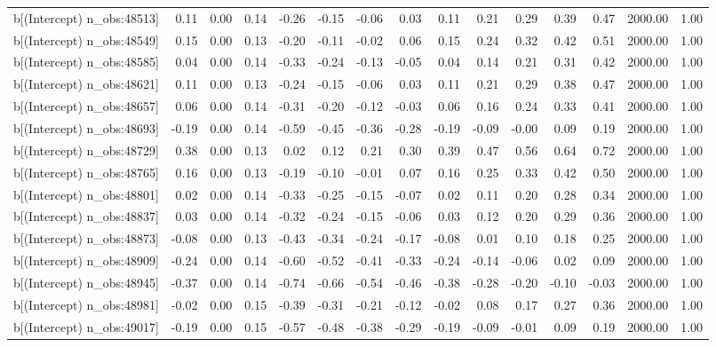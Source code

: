 \begin{table}[ht]
\begin{tabular}{rrrrrrrrrrrrrrr}
  b[(Intercept) n\_obs:48513] & 0.11 & 0.00 & 0.14 & -0.26 & -0.15 & -0.06 & 0.03 & 0.11 & 0.21 & 0.29 & 0.39 & 0.47 & 2000.00 & 1.00 \\ 
  b[(Intercept) n\_obs:48549] & 0.15 & 0.00 & 0.13 & -0.20 & -0.11 & -0.02 & 0.06 & 0.15 & 0.24 & 0.32 & 0.42 & 0.51 & 2000.00 & 1.00 \\ 
  b[(Intercept) n\_obs:48585] & 0.04 & 0.00 & 0.14 & -0.33 & -0.24 & -0.13 & -0.05 & 0.04 & 0.14 & 0.21 & 0.31 & 0.42 & 2000.00 & 1.00 \\ 
  b[(Intercept) n\_obs:48621] & 0.11 & 0.00 & 0.13 & -0.24 & -0.15 & -0.06 & 0.03 & 0.11 & 0.21 & 0.29 & 0.38 & 0.47 & 2000.00 & 1.00 \\ 
  b[(Intercept) n\_obs:48657] & 0.06 & 0.00 & 0.14 & -0.31 & -0.20 & -0.12 & -0.03 & 0.06 & 0.16 & 0.24 & 0.33 & 0.41 & 2000.00 & 1.00 \\ 
  b[(Intercept) n\_obs:48693] & -0.19 & 0.00 & 0.14 & -0.59 & -0.45 & -0.36 & -0.28 & -0.19 & -0.09 & -0.00 & 0.09 & 0.19 & 2000.00 & 1.00 \\ 
  b[(Intercept) n\_obs:48729] & 0.38 & 0.00 & 0.13 & 0.02 & 0.12 & 0.21 & 0.30 & 0.39 & 0.47 & 0.56 & 0.64 & 0.72 & 2000.00 & 1.00 \\ 
  b[(Intercept) n\_obs:48765] & 0.16 & 0.00 & 0.13 & -0.19 & -0.10 & -0.01 & 0.07 & 0.16 & 0.25 & 0.33 & 0.42 & 0.50 & 2000.00 & 1.00 \\ 
  b[(Intercept) n\_obs:48801] & 0.02 & 0.00 & 0.14 & -0.33 & -0.25 & -0.15 & -0.07 & 0.02 & 0.11 & 0.20 & 0.28 & 0.34 & 2000.00 & 1.00 \\ 
  b[(Intercept) n\_obs:48837] & 0.03 & 0.00 & 0.14 & -0.32 & -0.24 & -0.15 & -0.06 & 0.03 & 0.12 & 0.20 & 0.29 & 0.36 & 2000.00 & 1.00 \\ 
  b[(Intercept) n\_obs:48873] & -0.08 & 0.00 & 0.13 & -0.43 & -0.34 & -0.24 & -0.17 & -0.08 & 0.01 & 0.10 & 0.18 & 0.25 & 2000.00 & 1.00 \\ 
  b[(Intercept) n\_obs:48909] & -0.24 & 0.00 & 0.14 & -0.60 & -0.52 & -0.41 & -0.33 & -0.24 & -0.14 & -0.06 & 0.02 & 0.09 & 2000.00 & 1.00 \\ 
  b[(Intercept) n\_obs:48945] & -0.37 & 0.00 & 0.14 & -0.74 & -0.66 & -0.54 & -0.46 & -0.38 & -0.28 & -0.20 & -0.10 & -0.03 & 2000.00 & 1.00 \\ 
  b[(Intercept) n\_obs:48981] & -0.02 & 0.00 & 0.15 & -0.39 & -0.31 & -0.21 & -0.12 & -0.02 & 0.08 & 0.17 & 0.27 & 0.36 & 2000.00 & 1.00 \\ 
  b[(Intercept) n\_obs:49017] & -0.19 & 0.00 & 0.15 & -0.57 & -0.48 & -0.38 & -0.29 & -0.19 & -0.09 & -0.01 & 0.09 & 0.19 & 2000.00 & 1.00 \\ 

\end{tabular}
\end{table}
